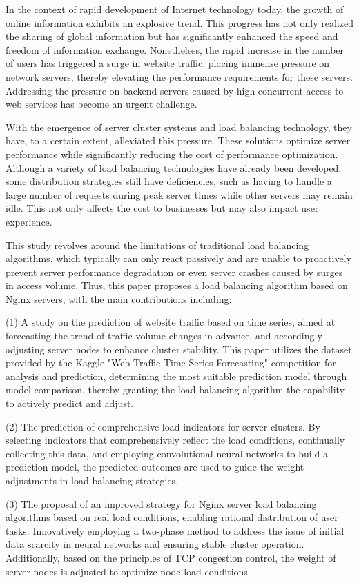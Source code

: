 \begin{eabstract}

	In the context of rapid development of Internet technology today, the growth of online information exhibits an explosive trend. This progress has not only realized the sharing of global information but has significantly enhanced the speed and freedom of information exchange. Nonetheless, the rapid increase in the number of users has triggered a surge in website traffic, placing immense pressure on network servers, thereby elevating the performance requirements for these servers. Addressing the pressure on backend servers caused by high concurrent access to web services has become an urgent challenge.

	With the emergence of server cluster systems and load balancing technology, they have, to a certain extent, alleviated this pressure. These solutions optimize server performance while significantly reducing the cost of performance optimization. Although a variety of load balancing technologies have already been developed, some distribution strategies still have deficiencies, such as having to handle a large number of requests during peak server times while other servers may remain idle. This not only affects the cost to businesses but may also impact user experience.

	This study revolves around the limitations of traditional load balancing algorithms, which typically can only react passively and are unable to proactively prevent server performance degradation or even server crashes caused by surges in access volume. Thus, this paper proposes a load balancing algorithm based on Nginx servers, with the main contributions including:

	(1) A study on the prediction of website traffic based on time series, aimed at forecasting the trend of traffic volume changes in advance, and accordingly adjusting server nodes to enhance cluster stability. This paper utilizes the dataset provided by the Kaggle "Web Traffic Time Series Forecasting" competition for analysis and prediction, determining the most suitable prediction model through model comparison, thereby granting the load balancing algorithm the capability to actively predict and adjust.

	(2) The prediction of comprehensive load indicators for server clusters. By selecting indicators that comprehensively reflect the load conditions, continually collecting this data, and employing convolutional neural networks to build a prediction model, the predicted outcomes are used to guide the weight adjustments in load balancing strategies.

	(3) The proposal of an improved strategy for Nginx server load balancing algorithms based on real load conditions, enabling rational distribution of user tasks. Innovatively employing a two-phase method to address the issue of initial data scarcity in neural networks and ensuring stable cluster operation. Additionally, based on the principles of TCP congestion control, the weight of server nodes is adjusted to optimize node load conditions.
\end{eabstract}

